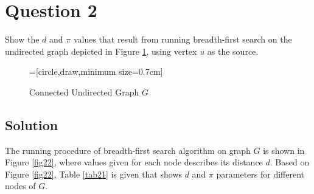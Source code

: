 
\section*{Question 2}

Show the $d$ and $\pi$ values that result from running breadth-first search on the undirected graph depicted in Figure \ref{fig21}, using vertex $u$ as the source.

\def\dist{1cm}
\begin{figure}[H]\centering
{}=[circle,draw,minimum size=0.7cm]
\caption{Connected Undirected Graph $G$}\label{fig21}
\end{figure}

\subsection*{Solution}

The running procedure of breadth-first search algorithm on graph $G$ is shown in Figure \ref{fig22}, where values given for each node describes its distance $d$. Based on Figure \ref{fig22}, Table \ref{tab21} is given that shows $d$ and $\pi$ parameters for different nodes of $G$.

